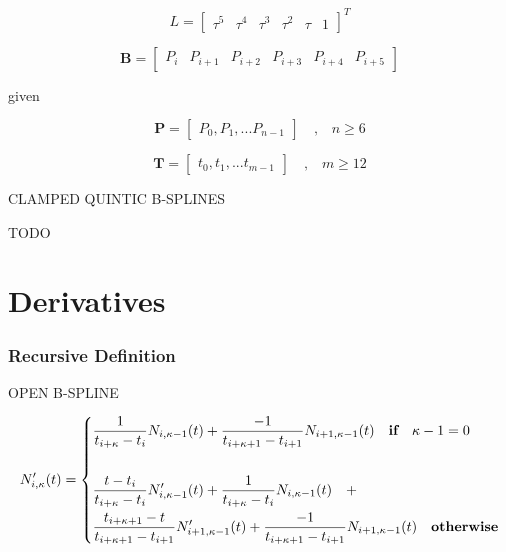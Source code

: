 \documentclass{article}
\begin{document}
    \begin{equation}
        L = \begin{bmatrix} \tau^5 & \tau^{4} & \tau^{3} & \tau^{2} & \tau & 1 \end{bmatrix}^{T}
    \end{equation}
    
    \begin{equation}
        \textbf{B} = \begin{bmatrix} P_{i} & P_{i+1} & P_{i+2} & P_{i+3} & P_{i+4} & P_{i+5}\end{bmatrix}
    \end{equation}
    
    given
    
    \begin{equation}
    \textbf{P} = \begin{bmatrix} P_0, P_1, ... P_{n-1} \end{bmatrix} \quad \text{,} \quad n \geq 6
    \end{equation}
    
    \begin{equation}
        \textbf{T} = \begin{bmatrix} t_0, t_1, ... t_{m-1} \end{bmatrix} \quad \text{,} \quad m \geq 12
    \end{equation}
    
    
\noindent CLAMPED QUINTIC B-SPLINES
\hfill \break

    TODO

\section{Derivatives}

\subsubsection{Recursive Definition}

OPEN B-SPLINE

 \begin{equation} \label{eq:Basis function equation}
  N_{i,\kappa}'(t) = \begin{dcases} 
  \frac{1}{t_{i+\kappa} - t_i} N_{i,\kappa-1}(t) +  \frac{-1}{t_{i+\kappa+1}-t_{i+1}} N_{i+1 , \kappa-1}(t) \quad \textbf{if}  \quad \kappa-1 = 0 \\ \\
  \frac{t - t_i}{t_{i+\kappa} - t_i} N_{i,\kappa-1}'(t) + \frac{1}{t_{i+\kappa} - t_i} N_{i,\kappa-1}(t) \quad + \\
  \frac{t_{i+\kappa+1} - t}{t_{i+\kappa+1}-t_{i+1}} N_{i+1 , \kappa-1}'(t) +  \frac{-1}{t_{i+\kappa+1}-t_{i+1}} N_{i+1 , \kappa-1}(t) \quad \textbf{otherwise} 
  \end{dcases}
  \end{equation}
  
\end{document}
